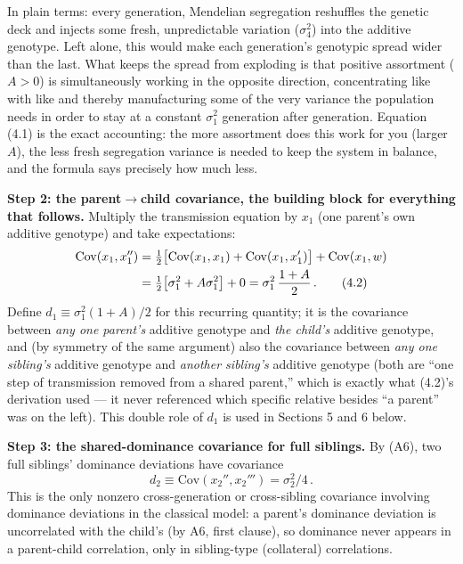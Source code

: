 \documentclass[12pt]{article}
\begin{document}
In plain terms: every generation, Mendelian segregation reshuffles the genetic deck and injects some fresh, unpredictable variation ($\sigma_4^2$) into the additive genotype. Left alone, this would make each generation's genotypic spread wider than the last. What keeps the spread from exploding is that positive assortment ($A>0$) is simultaneously working in the opposite direction, concentrating like with like and thereby manufacturing some of the very variance the population needs in order to stay at a constant $\sigma_1^2$ generation after generation. Equation (4.1) is the exact accounting: the more assortment does this work for you (larger $A$), the less fresh segregation variance is needed to keep the system in balance, and the formula says precisely how much less.

\textbf{Step 2: the parent$\to$child covariance, the building block for everything that follows.} Multiply the transmission equation by $x_1$ (one parent's own additive genotype) and take expectations:
\begin{align}
\mathrm{Cov}(x_1,x_1'') &= \tfrac12\big[\mathrm{Cov}(x_1,x_1)+\mathrm{Cov}(x_1,x_1')\big] + \mathrm{Cov}(x_1,w) \notag \\
&= \tfrac12\big[\sigma_1^2 + A\sigma_1^2\big] + 0 = \sigma_1^2\,\frac{1+A}{2} \, . \tag{4.2}
\end{align}
Define $d_1 \equiv \sigma_1^2(1+A)/2$ for this recurring quantity; it is the covariance between \emph{any one parent's} additive genotype and \emph{the child's} additive genotype, and (by symmetry of the same argument) also the covariance between \emph{any one sibling's} additive genotype and \emph{another sibling's} additive genotype (both are ``one step of transmission removed from a shared parent,'' which is exactly what (4.2)'s derivation used — it never referenced which specific relative besides ``a parent'' was on the left). This double role of $d_1$ is used in Sections 5 and 6 below.

\textbf{Step 3: the shared-dominance covariance for full siblings.} By (A6), two full siblings' dominance deviations have covariance
\begin{equation}
d_2 \equiv \mathrm{Cov}(x_2'',x_2''') = \sigma_2^2/4 \, . \tag{4.3}
\end{equation}
This is the only nonzero cross-generation or cross-sibling covariance involving dominance deviations in the classical model: a parent's dominance deviation is uncorrelated with the child's (by A6, first clause), so dominance never appears in a parent-child correlation, only in sibling-type (collateral) correlations.
\end{document}
